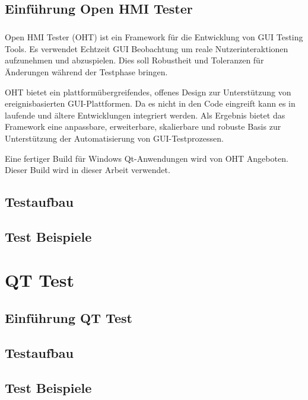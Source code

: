 		\section{Einführung Open HMI Tester}
		\paragraph{} Open HMI Tester (OHT) ist ein Framework für die Entwicklung von GUI Testing Tools. Es verwendet Echtzeit GUI Beobachtung um reale Nutzerinteraktionen aufzunehmen und abzuspielen. Dies soll Robustheit und Toleranzen für Änderungen während der Testphase bringen.
		
		OHT bietet ein plattformübergreifendes, offenes Design zur Unterstützung von ereignisbasierten GUI-Plattformen. Da es nicht in den Code eingreift kann es in laufende und ältere Entwicklungen integriert werden. Als Ergebnis bietet das Framework eine anpassbare, erweiterbare, skalierbare und robuste Basis zur Unterstützung der Automatisierung von GUI-Testprozessen.
		
		Eine fertiger Build für Windows Qt-Anwendungen wird von OHT Angeboten. Dieser Build wird in dieser Arbeit verwendet.
		
		\section{Testaufbau}
		\section{Test Beispiele}
		
\chapter{QT Test}
		
		\section{Einführung QT Test}
		\section{Testaufbau}
		\section{Test Beispiele}
		
